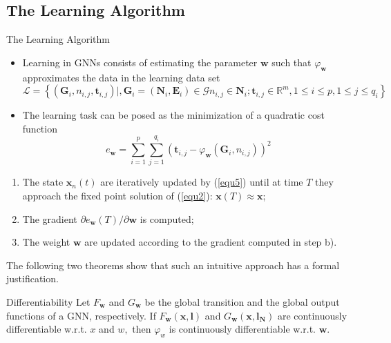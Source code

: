 \documentclass[10pt,aspectratio=169]{beamer}
\begin{document}
\subsection{The Learning Algorithm}
\begin{frame}[allowframebreaks]{The Learning Algorithm}
\begin{itemize}
    \item Learning in GNNs consists of estimating the parameter $\boldsymbol{w}$ such that $\varphi_{\boldsymbol{w}}$ approximates the data in the learning data set
    $$
    \mathcal{L}=\left\{\left(\boldsymbol{G}_{i}, n_{i, j}, \boldsymbol{t}_{i, j}\right) \mid, \boldsymbol{G}_{i}=\left(\boldsymbol{N}_{i}, \boldsymbol{E}_{i}\right) \in \mathcal{G} 
    n_{i, j} \in \boldsymbol{N}_{i} ; \boldsymbol{t}_{i, j} \in \mathbb{R}^{m}, 1 \leq i \leq p, 1 \leq j \leq q_{i}\right\}
    $$
    \item The learning task can be posed as the minimization of a quadratic cost function
    \begin{equation}
        e_{\boldsymbol{w}}=\sum_{i=1}^{p} \sum_{j=1}^{q_{i}}\left(\boldsymbol{t}_{i, j}-\varphi_{\boldsymbol{w}}\left(\boldsymbol{G}_{i}, n_{i, j}\right)\right)^{2}
    \end{equation}
\end{itemize}

\framebreak

\begin{enumerate}[a]
    \item The state $\boldsymbol{x}_n(t)$ are iteratively updated by (\ref{equ5}) until at time $T$ they approach the fixed point solution of (\ref{equ2}): $\boldsymbol{x}(T) \approx \boldsymbol{x}$;
    \item The gradient $\partial e_{\boldsymbol{w}}(T) / \partial \boldsymbol{w}$ is computed;
    \item The weight $\boldsymbol{w}$ are updated according to the gradient computed in step b).
\end{enumerate}

\framebreak

The following two theorems show that such an intuitive
approach has a formal justification.

\begin{theorem}{Differentiability}
Let $F_{\boldsymbol{w}}$ and $G_{\boldsymbol{w}}$ be the global transition and the global output functions of a GNN, respectively. If $F_{\boldsymbol{w}}(\boldsymbol{x}, \boldsymbol{l})$ and $G_{\boldsymbol{w}}\left(\boldsymbol{x}, \boldsymbol{l}_{\boldsymbol{N}}\right)$ are continuously differentiable w.r.t. $x$ and $w,$ then $\varphi_{w}$ is continuously differentiable w.r.t. $\boldsymbol{w}$.
\end{theorem}


\end{frame}
\end{document}
